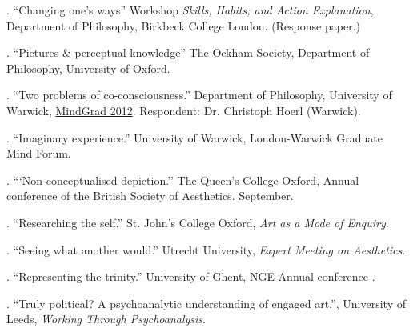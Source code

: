 \documentclass[11pt]{article}
\begin{document}
\bigskip

\newpage
\medskip
{}. ``Changing one's ways'' Workshop \emph{Skills, Habits, and Action Explanation}, Department of Philosophy, Birkbeck College London. (Response paper.)

. ``Pictures \& perceptual knowledge'' The Ockham Society, Department of Philosophy, University of Oxford.

. ``Two problems of co-consciousness.'' Department of Philosophy, University of Warwick, \href{http://www2.warwick.ac.uk/fac/soc/philosophy/news/conferences/mindgrad-2012/}{MindGrad 2012}. Respondent: Dr. Christoph Hoerl (Warwick).

. ``Imaginary experience.'' University of Warwick, London-Warwick Graduate Mind Forum.


. ```Non-conceptualised depiction.'' The Queen's College Oxford, Annual conference of the British Society of Aesthetics. September.

. ``Researching the self.'' St. John's College Oxford, \emph{Art as a Mode of Enquiry}.

. ``Seeing what another would.'' Utrecht University, \emph{Expert Meeting on Aesthetics}.

. ``Representing the trinity.'' University of Ghent, NGE Annual conference .

. ``Truly political? A psychoanalytic understanding of engaged art.'', University of Leeds, \emph{Working Through Psychoanalysis}.

% 

\bigskip

% 
% 
% 
% 
\end{document}

